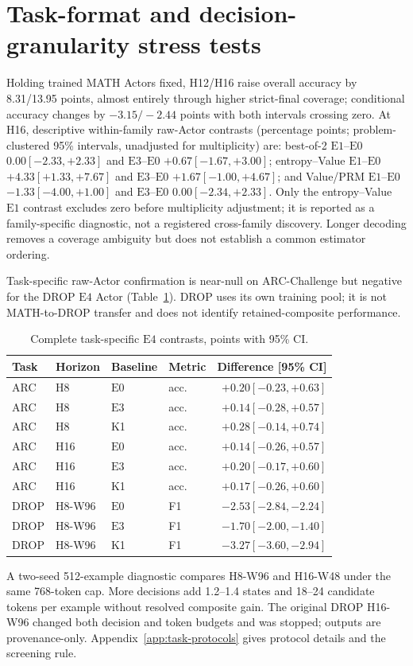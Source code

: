 \documentclass[10pt]{article}
\newcommand{\Ezero}{\ensuremath{\mathrm{E0}}}
\newcommand{\Eone}{\ensuremath{\mathrm{E1}}}
\newcommand{\Ethree}{\ensuremath{\mathrm{E3}}}
\newcommand{\Efour}{\ensuremath{\mathrm{E4}}}
\begin{document}
\section{Task-format and decision-granularity stress tests}
\label{sec:cross-task}
Holding trained MATH Actors fixed, H12/H16 raise overall accuracy by 8.31/13.95
points, almost entirely through higher strict-final coverage; conditional
accuracy changes by \(-3.15/-2.44\) points with both intervals crossing zero.
At H16, descriptive within-family raw-Actor contrasts (percentage points;
problem-clustered 95\% intervals, unadjusted for multiplicity) are: best-of-2
\Eone{}--\Ezero{} \(0.00[-2.33,+2.33]\) and
\Ethree{}--\Ezero{} \(+0.67[-1.67,+3.00]\); entropy--Value
\Eone{}--\Ezero{} \(+4.33[+1.33,+7.67]\) and
\Ethree{}--\Ezero{} \(+1.67[-1.00,+4.67]\); and Value/PRM
\Eone{}--\Ezero{} \(-1.33[-4.00,+1.00]\) and
\Ethree{}--\Ezero{} \(0.00[-2.34,+2.33]\).  Only the entropy--Value
\Eone{} contrast excludes zero before multiplicity adjustment; it is reported
as a family-specific diagnostic, not a registered cross-family discovery.
Longer decoding removes a coverage ambiguity but does not establish a common
estimator ordering.

Task-specific raw-Actor confirmation is near-null on ARC-Challenge but negative
for the DROP \Efour{} Actor (Table~\ref{tab:cross-task}). DROP uses its own
training pool; it is not MATH-to-DROP transfer and does not identify
retained-composite performance.
\begin{table}[t]
\caption{Complete task-specific \Efour{} contrasts, points with 95\% CI.}
\label{tab:cross-task}\centering\scriptsize
\begin{tabular}{llllr}\toprule
Task & Horizon & Baseline & Metric & Difference [95\% CI]\\\midrule
ARC & H8 & \Ezero & acc. & \(+0.20[-0.23,+0.63]\)\\
ARC & H8 & \Ethree & acc. & \(+0.14[-0.28,+0.57]\)\\
ARC & H8 & K1 & acc. & \(+0.28[-0.14,+0.74]\)\\
ARC & H16 & \Ezero & acc. & \(+0.14[-0.26,+0.57]\)\\
ARC & H16 & \Ethree & acc. & \(+0.20[-0.17,+0.60]\)\\
ARC & H16 & K1 & acc. & \(+0.17[-0.26,+0.60]\)\\
DROP & H8-W96 & \Ezero & F1 & \(-2.53[-2.84,-2.24]\)\\
DROP & H8-W96 & \Ethree & F1 & \(-1.70[-2.00,-1.40]\)\\
DROP & H8-W96 & K1 & F1 & \(-3.27[-3.60,-2.94]\)\\\bottomrule
\end{tabular}
\end{table}
A two-seed 512-example diagnostic compares H8-W96 and H16-W48 under the same
768-token cap. More decisions add 1.2--1.4 states and 18--24 candidate tokens
per example without resolved composite gain. The original DROP H16-W96 changed
both decision and token budgets and was stopped; outputs are provenance-only.
Appendix~\ref{app:task-protocols} gives protocol details and the screening rule.
\end{document}
